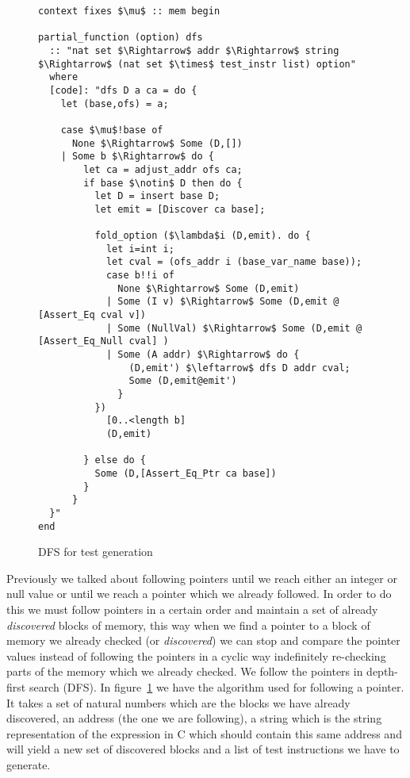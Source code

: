\begin{figure}
\begin{lstlisting}[mathescape=true]
context fixes $\mu$ :: mem begin

partial_function (option) dfs
  :: "nat set $\Rightarrow$ addr $\Rightarrow$ string $\Rightarrow$ (nat set $\times$ test_instr list) option"
  where
  [code]: "dfs D a ca = do {
    let (base,ofs) = a;

    case $\mu$!base of
      None $\Rightarrow$ Some (D,[])
    | Some b $\Rightarrow$ do {
        let ca = adjust_addr ofs ca;
        if base $\notin$ D then do {
          let D = insert base D;
          let emit = [Discover ca base];

          fold_option ($\lambda$i (D,emit). do {
            let i=int i;
            let cval = (ofs_addr i (base_var_name base));
            case b!!i of
              None $\Rightarrow$ Some (D,emit)
            | Some (I v) $\Rightarrow$ Some (D,emit @ [Assert_Eq cval v])
            | Some (NullVal) $\Rightarrow$ Some (D,emit @ [Assert_Eq_Null cval] )
            | Some (A addr) $\Rightarrow$ do {
                (D,emit') $\leftarrow$ dfs D addr cval;
                Some (D,emit@emit')
              }
          })
            [0..<length b]
            (D,emit)

        } else do {
          Some (D,[Assert_Eq_Ptr ca base])
        }
      }
  }"
end
\end{lstlisting}

\caption{DFS for test generation}
\label{fig:dfs_test}
\end{figure}

Previously we talked about following pointers until we reach either an integer or null value or until we reach a pointer which we already followed.
In order to do this we must follow pointers in a certain order and maintain a set of already \textit{discovered} blocks of memory, this way when we find a pointer to a block of memory we already checked (or \textit{discovered}) we can stop and compare the pointer values instead of following the pointers in a cyclic way indefinitely re-checking parts of the memory which we already checked.
We follow the pointers in depth-first search (DFS).
In figure~\ref{fig:dfs_test} we have the algorithm used for following a pointer.
It takes a set of natural numbers which are the blocks we have already discovered, an address (the one we are following), a string which is the string representation of the expression in C which should contain this same address and will yield a new set of discovered blocks and a list of test instructions we have to generate.


